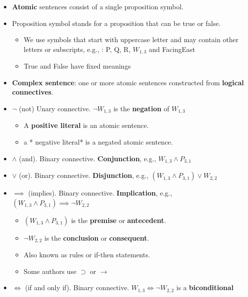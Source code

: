\documentclass[11pt]{article}
\begin{document}
\begin{itemize}
\item \textbf{Atomic} sentences consist of a single proposition symbol.
\item Proposition symbol stands for a proposition that can be true or false.

\begin{itemize}
\item We use symbols that start with uppercase letter and may contain other letters or subscripts, e.g., : P, Q, R, \(W_{1,3}\) and FacingEast
\item True and False have fixed meanings
\end{itemize}

\item \textbf{Complex sentence}: one or more atomic sentences constructed from \textbf{logical connectives}.

\item \(\neg\) (not) Unary connective.  \(\neg W_{1,3}\) is the \textbf{negation} of \(W_{1,3}\)

\begin{itemize}
\item A \textbf{positive literal} is an atomic sentence.
\item a * negative literal* is a negated atomic sentence.
\end{itemize}

\item \(\land\) (and).  Binary connective.  \textbf{Conjunction}, e.g., \(W_{1,3} \land P_{3,1}\)

\item \(\lor\) (or).  Binary connective.  \textbf{Disjunction}, e.g., \((W_{1,3} \land P_{3,1}) \lor W_{2,2}\)

\item \(\implies\) (implies).  Binary connective.  \textbf{Implication}, e.g., \((W_{1,3} \land P_{3,1}) \implies \neg W_{2,2}\)

\begin{itemize}
\item \((W_{1,3} \land P_{3,1})\) is the \textbf{premise} or \textbf{antecedent}.
\item \(\neg W_{2,2}\) is the \textbf{conclusion} or \textbf{consequent}.
\item Also known as rules or if-then statements.
\item Some authors use \(\supset\) or \(\rightarrow\)
\end{itemize}

\item \(\iff\) (if and only if).  Binary connective. \(W_{1,3} \iff \neg W_{2,2}\) is a \textbf{biconditional}
\end{itemize}
\end{document}

